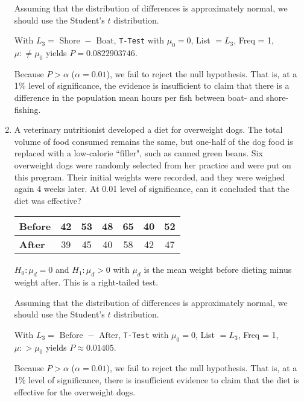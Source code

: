 \documentclass{article}
\newcommand{\answer}[1]{\color{white}#1}
\begin{document}
\begin{enumerate}
{Assuming that the distribution of differences is approximately normal, we should use the Student's $t$ distribution.  

With $L_3 = \mbox{ Shore } - \mbox{ Boat}$, 
\texttt{T-Test} with $\mu_0 = 0$, List $=L_3$, Freq = 1, $\mu: \neq \mu_0$ yields $P = 0.0822903746$.  
	
Because $P > \alpha$ ($\alpha= 0.01$), we fail to reject the null hypothesis.  That is, at a 1\% level of significance, the evidence is insufficient to claim that there is a difference in the population mean hours per fish between boat- and shore-fishing.  
} 

\vfill 

\item A veterinary nutritionist developed a diet for overweight dogs. The total volume of food consumed remains the same, but one-half of the dog food is replaced with a low-calorie ``filler", such as canned green beans. Six overweight dogs were randomly selected from her practice and were put on this program. Their initial weights were recorded, and they were weighed again 4 weeks later. At 0.01 level of significance, can it concluded that the diet was effective?

\begin{center}
\begin{tabular}{l|cccccc}
    \textbf{Before} & 42 & 53 & 48 & 65 & 40 & 52 \\
    \hline
    \textbf{After}  & 39 & 45 & 40 & 58 & 42 & 47 \\
\end{tabular}
\end{center}

{\answer $H_0: \mu_d = 0$ and $H_1: \mu_d > 0$ with $\mu_d$ is the mean weight before dieting minus weight after.
This is a right-tailed test.  

Assuming that the distribution of differences is approximately normal, we should use the Student's $t$ distribution.  

With $L_3 = \mbox{ Before } - \mbox{ After}$, 
\texttt{T-Test} with $\mu_0 = 0$, List $=L_3$, Freq = 1, $\mu: > \mu_0$ yields $P \approx 0.01405$.  
	
Because $P > \alpha$ ($\alpha= 0.01$), we fail to reject the null hypothesis.  That is, at a 1\% level of significance, there is insufficient evidence to claim that the diet is effective for the overweight dogs.} 

\vfill

\end{enumerate}
\end{document}
